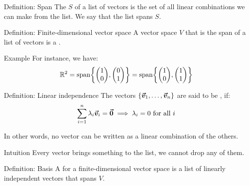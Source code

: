 \documentclass[a4paper]{article}
\begin{document}
\begin{parag}{Definition: Span}
    The  $S$ of a list of vectors is the set of all linear combinations we can make from the list. We say that the list spans $S$.
\end{parag}

\begin{parag}{Definition: Finite-dimensional vector space}
    A vector space $V$ that is the span of a list of vectors is a .

    \begin{subparag}{Example}
        For instance, we have: 
        \[\mathbb{R}^2 = \Span\left\{\begin{pmatrix} 1 \\ 0 \end{pmatrix}, \begin{pmatrix} 0 \\ 1 \end{pmatrix} \right\} = \Span\left\{\begin{pmatrix} 1 \\ 0 \end{pmatrix}, \begin{pmatrix} 1 \\ 1 \end{pmatrix} \right\}\]
    \end{subparag}
\end{parag}

\begin{parag}{Definition: Linear independence}
    The vectors $\left\{\bvec{v}_1, \ldots, \bvec{v}_n\right\}$ are said to be , if: 
    \[\sum_{i=1}^{n} \lambda_i \bm{\protect\vec{v}}_i = \bm{\protect\vec{0}} \implies \lambda_i = 0 \text{ for all } i\]
    
    In other words, no vector can be written as a linear combination of the others.

    \begin{subparag}{Intuition}
        Every vector brings something to the list, we cannot drop any of them.
    \end{subparag}
\end{parag}

\begin{parag}{Definition: Basis}
    A  for a finite-dimensional vector space is a list of linearly independent vectors that spans $V$.
\end{parag}
\end{document}
